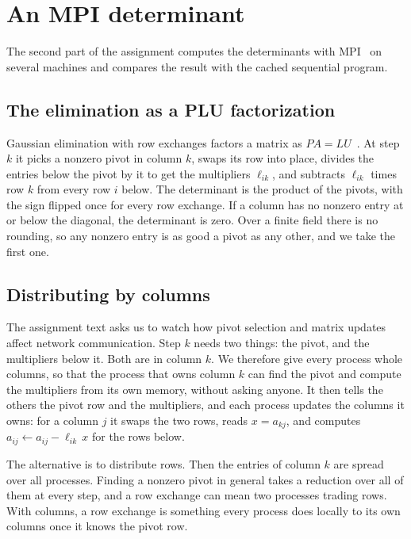 \section{An MPI determinant}
\label{sec:mpidesign}

The second part of the assignment computes the determinants with MPI~\cite{mpi40} on
several machines and compares the result with the cached sequential program.

\subsection{The elimination as a PLU factorization}

Gaussian elimination with row exchanges factors a matrix as
$PA = LU$~\cite{golub2013matrix}. At step $k$ it picks a nonzero pivot in column $k$, swaps
its row into place, divides the entries below the pivot by it to get the multipliers
$\ell_{ik}$, and subtracts $\ell_{ik}$ times row $k$ from every row $i$ below. The
determinant is the product of the pivots, with the sign flipped once for every row
exchange. If a column has no nonzero entry at or below the diagonal, the determinant is
zero. Over a finite field there is no rounding, so any nonzero entry is as good a pivot as
any other, and we take the first one.

\subsection{Distributing by columns}

The assignment text asks us to watch how pivot selection and matrix updates affect network
communication. Step $k$ needs two things: the pivot, and the multipliers below it. Both are
in column $k$. We therefore give every process whole columns, so that the process that owns
column $k$ can find the pivot and compute the multipliers from its own memory, without
asking anyone. It then tells the others the pivot row and the multipliers, and each process
updates the columns it owns: for a column $j$ it swaps the two rows, reads $x = a_{kj}$, and
computes $a_{ij} \leftarrow a_{ij} - \ell_{ik}\,x$ for the rows below.

The alternative is to distribute rows. Then the entries of column $k$ are spread over all
processes. Finding a nonzero pivot in general takes a reduction over all of them at every
step, and a row exchange can mean two processes trading rows. With columns, a row exchange
is something every process does locally to its own columns once it knows the pivot row.

